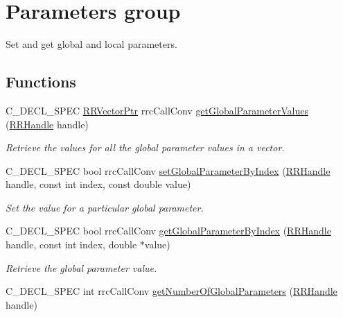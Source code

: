 \hypertarget{group__parameters}{}\section{Parameters group}
\label{group__parameters}


Set and get global and local parameters.  


\subsection*{Functions}
\begin{DoxyCompactItemize}
\item 
C\+\_\+\+D\+E\+C\+L\+\_\+\+S\+P\+E\+C \hyperlink{rrc__types_8h_a3be72d6006034fd349f753d2bf441bf7}{R\+R\+Vector\+Ptr} rrc\+Call\+Conv \hyperlink{group__parameters_ga8786ef7925e23f93be3826e3bc1a7c73}{get\+Global\+Parameter\+Values} (\hyperlink{rrc__types_8h_a1d68f0592372208fa5a5f2799ea4b3ae}{R\+R\+Handle} handle)
\begin{DoxyCompactList}\small\item\em Retrieve the values for all the global parameter values in a vector. \end{DoxyCompactList}\item 
C\+\_\+\+D\+E\+C\+L\+\_\+\+S\+P\+E\+C bool rrc\+Call\+Conv \hyperlink{group__parameters_ga3f4d3739191a328326e0de1f7c07334a}{set\+Global\+Parameter\+By\+Index} (\hyperlink{rrc__types_8h_a1d68f0592372208fa5a5f2799ea4b3ae}{R\+R\+Handle} handle, const int index, const double value)
\begin{DoxyCompactList}\small\item\em Set the value for a particular global parameter. \end{DoxyCompactList}\item 
C\+\_\+\+D\+E\+C\+L\+\_\+\+S\+P\+E\+C bool rrc\+Call\+Conv \hyperlink{group__parameters_gac2fed7cbeb8f0b2099f72f73de5dac36}{get\+Global\+Parameter\+By\+Index} (\hyperlink{rrc__types_8h_a1d68f0592372208fa5a5f2799ea4b3ae}{R\+R\+Handle} handle, const int index, double $\ast$value)
\begin{DoxyCompactList}\small\item\em Retrieve the global parameter value. \end{DoxyCompactList}\item 
C\+\_\+\+D\+E\+C\+L\+\_\+\+S\+P\+E\+C int rrc\+Call\+Conv \hyperlink{group__parameters_ga430bad38724b6db3feea39b31231e85e}{get\+Number\+Of\+Global\+Parameters} (\hyperlink{rrc__types_8h_a1d68f0592372208fa5a5f2799ea4b3ae}{R\+R\+Handle} handle)

\end{DoxyCompactItemize}

